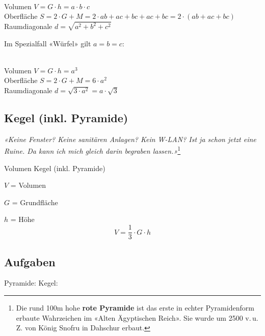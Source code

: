 \begin{gesetz}{}{}\\
  Volumen $V = G\cdot{} h = a\cdot{}b\cdot{}c$\\
  Oberfläche $S=2\cdot{}G + M = 2\cdot{}ab + ac + bc + ac + bc = 2\cdot{}(ab + ac + bc)$\\
  Raumdiagonale $d = \sqrt{a^2 + b^2 + c^2}$
\end{gesetz}

Im Spezialfall «Würfel» gilt $a=b=c$:
\begin{gesetz}{}{}\\
  Volumen $V = G\cdot{} h = a^3$\\
  Oberfläche $S=2\cdot{}G + M = 6\cdot{}a^2$\\
  Raumdiagonale $d = \sqrt{3\cdot{}a^2} = a\cdot{}\sqrt{3}$
\end{gesetz}


\newpage

\subsection{Kegel (inkl. Pyramide)}



\begin{center}
{\textit{«Keine Fenster? Keine sanitären Anlagen? Kein W-LAN? Ist ja schon
jetzt eine Ruine. Da kann ich mich gleich darin begraben
lassen.»}}\footnote{Die rund 100m hohe \textbf{rote Pyramide} ist das
  erste in echter Pyramidenform erbaute Wahrzeichen im «Alten
  Ägyptischen Reich». Sie wurde um 2500 v.\,u.\,Z. von König Snofru in
Dahschur erbaut.}
\end{center}


\begin{gesetz}{Volumen Kegel (inkl. Pyramide)}{}
  
  $V$ = Volumen
  
  $G$ = Grundfläche

  $h$ = Höhe
  $$V = \frac13\cdot{}G\cdot{}h$$
  \end{gesetz}

\subsection*{Aufgaben}
Pyramide:
Kegel:
\newpage


